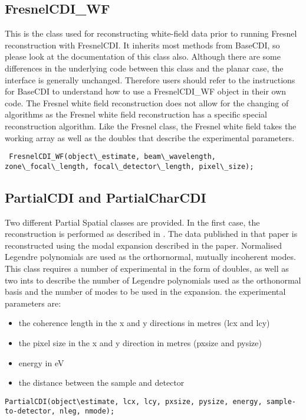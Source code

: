 \documentclass[]{nadia}
\begin{document}
\subsection{FresnelCDI\_WF}
This is the class used for reconstructing white-field data prior to
running Fresnel reconstruction with FresnelCDI. It inherits most
methods from BaseCDI, so please look at the documentation of this
class also. Although there are some differences in the underlying code
between this class and the planar case, the interface is generally
unchanged. Therefore users should refer to the instructions for
BaseCDI to understand how to use a FresnelCDI\_WF object in their own
code. The Fresnel white field reconstruction does not allow for the changing of 
algorithms as the Fresnel white field reconstruction has a specific special 
reconstruction algorithm. Like the Fresnel class, the Fresnel white field takes the 
working array as well as the doubles that describe the experimental parameters.

\begin{verbatim}
 FresnelCDI_WF(object\_estimate, beam\_wavelength, zone\_focal\_length, focal\_detector\_length, pixel\_size);
\end{verbatim}
 
\subsection{PartialCDI and PartialCharCDI}
Two different Partial Spatial classes are provided. In the first case, the reconstruction is performed as described in \cite{Whitehead:09}. The data published in that paper is reconstructed using the modal expansion described in the paper. Normalised Legendre polynomials are used as the orthornormal, mutually incoherent modes. This class requires a number of experimental  in the form of doubles, as well as two ints to describe the number of Legendre polynomials used as the orthonormal basis and the number of modes to be used in the expansion. the experimental parameters are:\\

\begin{itemize}
\item the coherence length in the x and y directions in metres (lcx and lcy)
\item the pixel size in the x and y direction in metres (pxsize and pysize)
\item energy in eV
\item the distance between the sample and detector
\end{itemize}
\begin{verbatim}
PartialCDI(object\estimate, lcx, lcy, pxsize, pysize, energy, sample-to-detector, nleg, nmode);
\end{verbatim}
 
\end{document}
